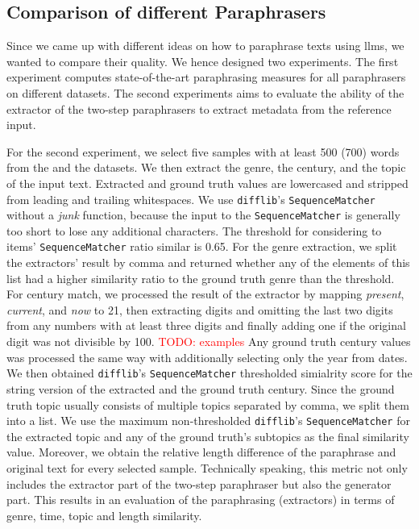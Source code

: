 \subsection{Comparison of different Paraphrasers}
\label{subsec:comp_paraphrasers_setup}

Since we came up with different ideas on how to paraphrase texts using \acp{llm}, we wanted to compare their quality.
We hence designed two experiments.
The first experiment computes state-of-the-art paraphrasing measures for all paraphrasers on different datasets.
The second experiments aims to evaluate the ability of the extractor of the two-step paraphrasers to extract metadata from the reference input.

For the second experiment, we select five samples with at least 500 (700) words from the \dataBlog{} and the \dataStudent{} datasets.
We then extract the genre, the century, and the topic of the input text.
Extracted and ground truth values are lowercased and stripped from leading and trailing whitespaces. 
We use \texttt{difflib}'s \texttt{SequenceMatcher} without a \textit{junk} function, because the input to the \texttt{SequenceMatcher} is generally too short to lose any additional characters.
The threshold for considering to items' \texttt{SequenceMatcher} ratio similar is 0.65.
For the genre extraction, we split the extractors' result by comma and returned whether any of the elements of this list had a higher similarity ratio to the ground truth genre than the threshold.
For century match, we processed the result of the extractor by mapping \textit{present}, \textit{current}, and \textit{now} to 21, then extracting digits and omitting the last two digits from any numbers with at least three digits and finally adding one if the original digit was not divisible by 100.
\textcolor{red}{TODO: examples}
Any ground truth century values was processed the same way with additionally selecting only the year from dates.
We then obtained \texttt{difflib}'s \texttt{SequenceMatcher} thresholded simialrity score for the string version of the extracted and the ground truth century.
Since the ground truth topic usually consists of multiple topics separated by comma, we split them into a list.
We use the maximum non-thresholded \texttt{difflib}'s \texttt{SequenceMatcher} for the extracted topic and any of the ground truth's subtopics as the final similarity value.
Moreover, we obtain the relative length difference of the paraphrase and original text for every selected sample. 
Technically speaking, this metric not only includes the extractor part of the two-step paraphraser but also the generator part.
This results in an evaluation of the paraphrasing (extractors) in terms of genre, time, topic and length similarity.